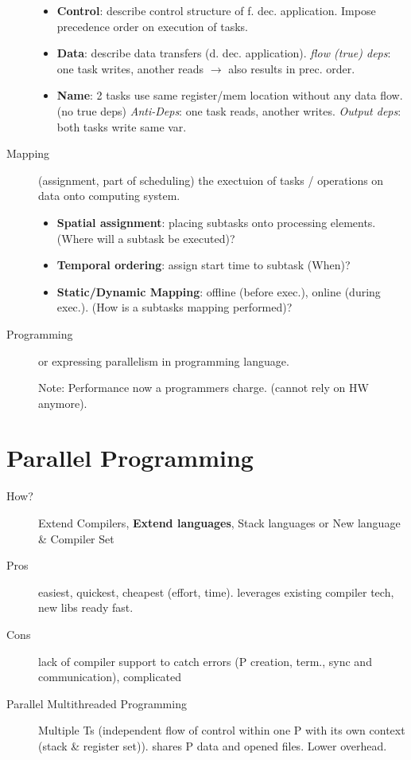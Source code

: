 \begin{description}
\begin{itemize}
            \item \textbf{Control}: describe control structure of f. dec. application. Impose precedence order on execution of tasks.
            \item \textbf{Data}: describe data transfers (d. dec. application). \textit{flow (true) deps}: one task writes, another reads $\rightarrow$ also results in prec. order.
            \item \textbf{Name}: 2 tasks use same register/mem location without any data flow. (no true deps) \textit{Anti-Deps}: one task reads, another writes. \textit{Output deps}: both tasks write same var.
        \end{itemize}
        \item[Mapping] (assignment, part of scheduling) the exectuion of tasks / operations on data onto computing system.
        \begin{itemize}
            \item \textbf{Spatial assignment}: placing subtasks onto processing elements. (Where will a subtask be executed)?
            \item \textbf{Temporal ordering}: assign start time to subtask (When)?
            \item \textbf{Static/Dynamic Mapping}: offline (before exec.), online (during exec.). (How is a subtasks mapping performed)?
        \end{itemize}
        \item[Programming] or expressing parallelism in programming language.
        \item[] Note: Performance now a programmers charge. (cannot rely on HW anymore).
\end{description}
\section*{Parallel Programming}
\begin{description}
    \item[How?] Extend Compilers, \textbf{Extend languages}, Stack languages or New language \& Compiler Set
    \item[Pros] easiest, quickest, cheapest (effort, time). leverages existing compiler tech, new libs ready fast.
    \item[Cons] lack of compiler support to catch errors (P creation, term., sync and communication), complicated
    \item[Parallel Multithreaded Programming]Multiple Ts (independent flow of control within one P with its own context (stack \& register set)). shares P data and opened files. Lower overhead. %
\end{description}
